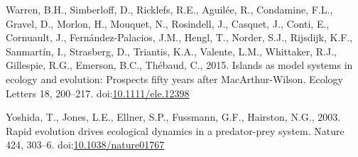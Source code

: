 \hypertarget{ref-Warren2015}{}
Warren, B.H., Simberloff, D., Ricklefs, R.E., Aguilée, R., Condamine,
F.L., Gravel, D., Morlon, H., Mouquet, N., Rosindell, J., Casquet, J.,
Conti, E., Cornuault, J., Fernández-Palacios, J.M., Hengl, T., Norder,
S.J., Rijsdijk, K.F., Sanmartín, I., Strasberg, D., Triantis, K.A.,
Valente, L.M., Whittaker, R.J., Gillespie, R.G., Emerson, B.C., Thébaud,
C., 2015. Islands as model systems in ecology and evolution: Prospects
fifty years after MacArthur-Wilson. Ecology Letters 18, 200--217.
doi:\href{https://doi.org/10.1111/ele.12398}{10.1111/ele.12398}

\hypertarget{ref-Yoshida2003}{}
Yoshida, T., Jones, L.E., Ellner, S.P., Fussmann, G.F., Hairston, N.G.,
2003. Rapid evolution drives ecological dynamics in a predator-prey
system. Nature 424, 303--6.
doi:\href{https://doi.org/10.1038/nature01767}{10.1038/nature01767}
